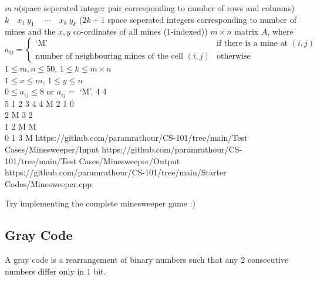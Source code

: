 \begin{testcasesMore}
	{%
	$m\ n$\hfill(space seperated integer pair corresponding to number of rows and columns)\\$k\quad x_1\ y_1\ \quad\cdots\quad x_{k}\ y_{k}$ \hfill($2k+1$ space seperated integers corresponding to number of mines and the $x,y$ co-ordinates of all mines (1-indexed))}
	{$m\times n$ matrix $A$, where $a_{ij}=\begin{cases}
		\text{`M'}& \text{if there is a mine at $(i,j)$} \\
		\text{number of neighbouring mines of the cell $(i,j)$} & \text{otherwise}
	\end{cases}$}
	{$1 \leq m,n \leq 50$, $1 \leq k \leq m\times n$\\$1 \leq x \leq m$, $1 \leq y \leq n$\\$0 \leq a_{ij} \leq 8$ or $a_{ij}=$ `M'.}%
	{4 4\\5 1  2  3 4 4}
	{M 2 1 0\\	2 M 3 2 \\	1 2 M M \\	0 1 3 M}
	{https://github.com/paramrathour/CS-101/tree/main/Test Cases/Minesweeper/Input}
	{https://github.com/paramrathour/CS-101/tree/main/Test Cases/Minesweeper/Output}
	{https://github.com/paramrathour/CS-101/tree/main/Starter Codes/Minesweeper.cpp}
\end{testcasesMore}
\begin{note}
	Try implementing the complete minesweeper game :)
\end{note}
\subsection{Gray Code}
A gray code is a rearrangement of binary numbers such that any 2 consecutive numbers differ only in 1 bit.

